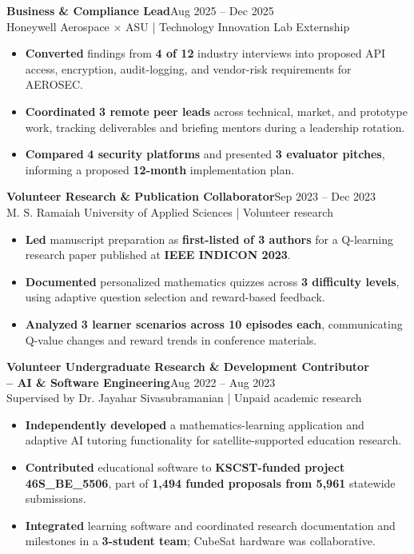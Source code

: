 \documentclass[letterpaper,10pt]{article}
\newcommand{\job}[3]{\noindent\textbf{#1}\hfill{\fontsize{10}{12}\selectfont #2}\\{\fontsize{10}{12}\selectfont #3}\vspace{1.5pt}}
\begin{document}
\job{Business \& Compliance Lead}{Aug 2025 -- Dec 2025}{Honeywell Aerospace $\times$ ASU | Technology Innovation Lab Externship}
\begin{itemize}
\item \textbf{Converted} findings from \textbf{4 of 12} industry interviews into proposed API access, encryption, audit-logging, and vendor-risk requirements for AEROSEC.
\item \textbf{Coordinated} \textbf{3 remote peer leads} across technical, market, and prototype work, tracking deliverables and briefing mentors during a leadership rotation.
\item \textbf{Compared} \textbf{4 security platforms} and presented \textbf{3 evaluator pitches}, informing a proposed \textbf{12-month} implementation plan.
\end{itemize}

\job{Volunteer Research \& Publication Collaborator}{Sep 2023 -- Dec 2023}{M. S. Ramaiah University of Applied Sciences | Volunteer research}
\begin{itemize}
\item \textbf{Led} manuscript preparation as \textbf{first-listed of 3 authors} for a Q-learning research paper published at \textbf{IEEE INDICON 2023}.
\item \textbf{Documented} personalized mathematics quizzes across \textbf{3 difficulty levels}, using adaptive question selection and reward-based feedback.
\item \textbf{Analyzed} \textbf{3 learner scenarios across 10 episodes each}, communicating Q-value changes and reward trends in conference materials.
\end{itemize}

\noindent\textbf{Volunteer Undergraduate Research \& Development Contributor}\\
\noindent\textbf{-- AI \& Software Engineering}\hfill{\fontsize{10}{12}\selectfont Aug 2022 -- Aug 2023}\\
{\fontsize{10}{12}\selectfont Supervised by Dr. Jayahar Sivasubramanian | Unpaid academic research}\vspace{1.5pt}
\begin{itemize}
\item \textbf{Independently developed} a mathematics-learning application and adaptive AI tutoring functionality for satellite-supported education research.
\item \textbf{Contributed} educational software to \textbf{KSCST-funded project 46S\_BE\_5506}, part of \textbf{1,494 funded proposals from 5,961} statewide submissions.
\item \textbf{Integrated} learning software and coordinated research documentation and milestones in a \textbf{3-student team}; CubeSat hardware was collaborative.
\end{itemize}
\end{document}
